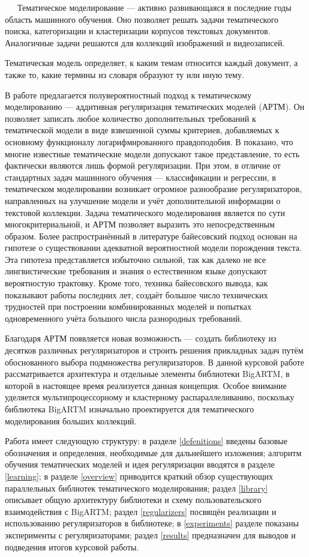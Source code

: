 
$\quad\;\:$Тематическое моделирование --- активно развивающаяся в последние годы область машинного обучения. Оно позволяет решать задачи тематического поиска, категоризации и кластеризации корпусов текстовых документов. Аналогичные задачи решаются для коллекций изображений и видеозаписей.

Тематическая модель определяет, к каким темам относится каждый документ, а также то, какие термины из словаря образуют ту или иную тему.

В работе \cite{voron2014} предлагается полувероятностный подход к тематическому моделированию --- аддитивная регуляризация тематических моделей (АРТМ). Он позволяет записать любое количество дополнительных требований к тематической модели в виде взвешенной суммы критериев, добавляемых к основному функционалу логарифмированного правдоподобия. В \cite{voron2014} показано, что многие известные тематические модели допускают такое представление, то есть фактически являются лишь формой регуляризации. При этом, в отличие от стандартных задач машинного обучения --- классификации и регрессии, в тематическом моделировании возникает огромное разнообразие регуляризаторов, направленных на улучшение модели и учёт дополнительной информации о текстовой коллекции. Задача тематического моделирования является по сути многокритериальной, и АРТМ позволяет выразить это непосредственным образом. Более распространённый в литературе байесовский подход основан на гипотезе о существовании адекватной вероятностной модели порождения текста. Эта гипотеза представляется избыточно сильной, так как далеко не все лингвистические требования и знания о естественном языке допускают вероятностую трактовку. Кроме того, техника байесовского вывода, как показывают работы последних лет, создаёт большое число технических трудностей при построении комбинированных моделей и попытках одновременного учёта большого числа разнородных требований.

Благодаря АРТМ появляется новая возможность --- создать библиотеку из десятков различных регуляризаторов и строить решения прикладных задач путём обоснованного выбора  подмножества регуляризаторов. В данной курсовой работе рассматривается архитектура и отдельные элементы библиотеки BigARTM, в которой в настоящее время реализуется данная концепция. Особое внимание уделяется мультипроцессорному и кластерному распараллеливанию, поскольку библиотека BigARTM изначально проектируется для тематического моделирования больших коллекций.   

Работа имеет следующую структуру: в разделе \ref{defenitions} введены базовые обозначения и определения, необходимые для дальнейшего изложения; алгоритм обучения тематических моделей и идея регуляризации вводятся в разделе \ref{learning}; в разделе \ref{overview} приводится краткий обзор существующих параллельных библиотек тематического моделирования; раздел \ref{library} описывает общую архитектуру библиотеки и схему пользовательского взаимодействия с BigARTM; раздел \ref{regularizers} посвящён реализации и использованию регуляризаторов в библиотеке; в \ref{experiments} разделе показаны эксперименты с регуляризаторами; раздел \ref{results} предназначен для выводов и подведения итогов курсовой работы.